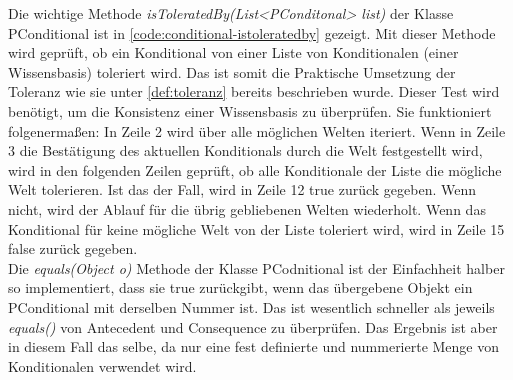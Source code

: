 \documentclass[12pt,a4paper]{article}
\begin{document}
Die wichtige Methode \textit{isToleratedBy(List<PConditonal> list)} der Klasse PConditional ist in \autoref{code:conditional-istoleratedby} gezeigt. Mit dieser Methode wird geprüft, ob ein Konditional von einer Liste von Konditionalen (einer Wissensbasis) toleriert wird. Das ist somit die Praktische Umsetzung der Toleranz wie sie unter \autoref{def:toleranz} bereits beschrieben wurde. Dieser Test wird benötigt, um die Konsistenz einer Wissensbasis zu überprüfen. Sie funktioniert folgenermaßen: In Zeile 2 wird über alle möglichen Welten iteriert. Wenn in Zeile 3 die Bestätigung des aktuellen Konditionals durch die Welt festgestellt wird, wird in den folgenden Zeilen geprüft, ob alle Konditionale der Liste die mögliche Welt tolerieren. Ist das der Fall, wird in Zeile 12 true zurück gegeben. Wenn nicht, wird der Ablauf für die übrig gebliebenen Welten wiederholt. Wenn das Konditional für keine mögliche Welt von der Liste toleriert wird, wird in Zeile 15 false zurück gegeben. \\
Die \textit{equals(Object o)} Methode der Klasse PCodnitional ist der Einfachheit halber so implementiert, dass sie true zurückgibt, wenn das übergebene Objekt ein PConditional mit derselben Nummer ist. Das ist wesentlich schneller als jeweils \textit{equals()} von Antecedent und Consequence zu überprüfen. Das Ergebnis ist aber in diesem Fall das selbe, da nur eine fest definierte und nummerierte Menge von Konditionalen verwendet wird.
\end{document}
